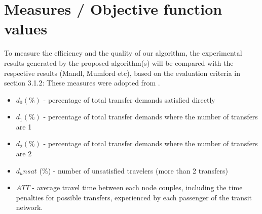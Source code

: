 \section{Measures / Objective function values}

To measure the efficiency and the quality of our algorithm, the experimental results generated by the proposed algorithm(s) will be compared with the respective results (Mandl, Mumford etc), based on the evaluation criteria in section 3.1.2: 
These measures were adopted from \citet{kechagiopoulos14}.

\begin{itemize}
\item $d_0 (\%)$ - percentage of total transfer demands satisfied directly
\item $d_1 (\%)$ - percentage of total transfer demands where the number of transfers are 1
\item $d_2 (\%)$ - percentage of total transfer demands where the number of transfers are 2
\item $d_unsat$ (\%) - number of unsatisfied travelers (more than 2 transfers)
\item $ATT$  - average travel time between each node couples, including the time penalties for possible transfers, experienced by each passenger of the transit network.
\end{itemize}


